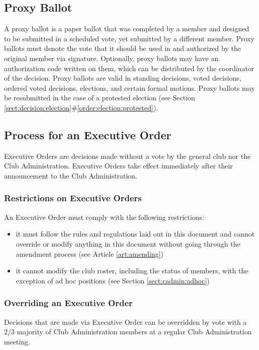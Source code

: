 \documentclass[english,11pt]{article}
\begin{document}
\subsection{Proxy Ballot} \label{sect:decision:proxy}
A proxy ballot is a paper ballot that was completed by a member and designed to be submitted in a scheduled vote, yet submitted by a different member.
Proxy ballots must denote the vote that it should be used in and authorized by the original member via signature.
Optionally, proxy ballots may have an authorization code written on them, which can be distributed by the coordinator of the decision.
Proxy ballots are valid in standing decisions, voted decisions, ordered voted decisions, elections, and certain formal motions.
Proxy ballots may be resubmitted in the case of a protested election (see Section \ref{sect:decision:election}\#\ref{order:election:protested}).

\subsection{Process for an Executive Order} \label{sect:decision:executive-order}
Executive Orders are decisions made without a vote by the general club nor the Club Administration.
Executive Orders take effect immediately after their announcement to the Club Administration.

\subsubsection{Restrictions on Executive Orders} \label{subsect:decision:executive-order:restrictions}
An Executive Order must comply with the following restrictions:

\begin{itemize}
    \item it must follow the rules and regulations laid out in this document and cannot override or modify anything in this document without going through the amendment process (see Article \ref{art:amending})
    \item it cannot modify the club roster, including the status of members, with the exception of ad hoc positions (see Section \ref{sect:cadmin:adhoc})
\end{itemize}

\subsubsection{Overriding an Executive Order} \label{subsect:decision:executive-order:override}
Decisions that are made via Executive Order can be overridden by vote with a 2/3 majority of Club Administration members at a regular Club Administration meeting.
\end{document}

